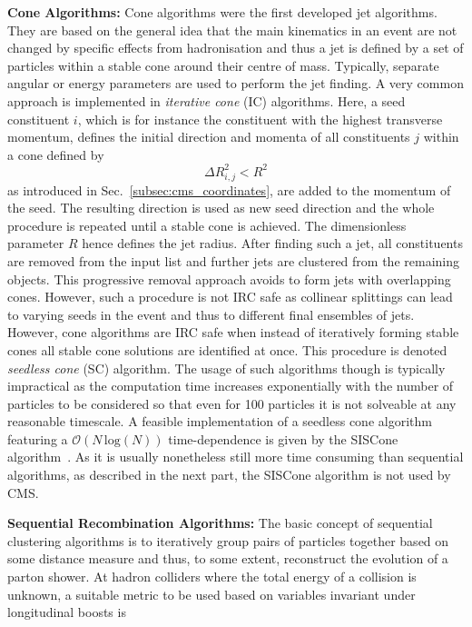 \begin{description}
 \item \textbf{Cone Algorithms:} Cone algorithms were the first developed jet algorithms. They are based on the general idea that the main kinematics in an event are not changed by specific effects from hadronisation and thus a jet is defined by a set of particles within a stable cone around their centre of mass. Typically, separate angular or energy parameters are used to perform the jet finding. A very common approach is implemented in \textit{iterative cone} (IC) algorithms. Here, a seed constituent $i$, which is for instance the constituent with the highest transverse momentum, defines the initial direction and momenta of all constituents $j$ within a cone defined by
\begin{equation}
 \Delta R_{i,j}^2 < R^2
\end{equation}
as introduced in Sec.~\ref{subsec:cms_coordinates}, are added to the momentum of the seed. The resulting direction is used as new seed direction and the whole procedure is repeated until a stable cone is achieved. The dimensionless parameter $R$ hence defines the jet radius. After finding such a jet, all constituents are removed from the input list and further jets are clustered from the remaining objects. This progressive removal approach avoids to form jets with overlapping cones. However, such a procedure is not IRC safe as collinear splittings can lead to varying seeds in the event and thus to different final ensembles of jets. \\
However, cone algorithms are IRC safe when instead of iteratively forming stable cones all stable cone solutions are identified at once. This procedure is denoted \textit{seedless cone} (SC) algorithm. The usage of such algorithms though is typically impractical as the computation time increases exponentially with the number of particles to be considered so that even for 100 particles it is not solveable at any reasonable timescale. A feasible implementation of a seedless cone algorithm featuring a $\mathcal{O}(N \, \mathrm{log} (N))$ time-dependence is given by the SISCone algorithm~\cite{Salam:2007xv}. As it is usually nonetheless still more time consuming than sequential algorithms, as described in the next part, the SISCone algorithm is not used by CMS.
 \item \textbf{Sequential Recombination Algorithms:} The basic concept of sequential clustering algorithms is to iteratively group pairs of particles together based on some distance measure and thus, to some extent, reconstruct the evolution of a parton shower. At hadron colliders where the total energy of a collision is unknown, a suitable metric to be used based on variables invariant under longitudinal boosts is 

\end{description}
